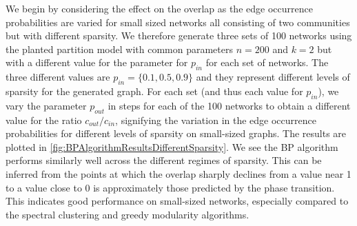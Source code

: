 We begin by considering the effect on the overlap as the edge occurrence probabilities are varied for small sized networks all consisting of two communities but with different sparsity.
We therefore generate three sets of 100 networks using the planted partition model with common parameters $n = 200$ and $k = 2$ but with a different value for the parameter for $p_{in}$ for each set of networks.
The three different values are $p_{in} = \{0.1, 0.5, 0.9\}$ and they represent different levels of sparsity for the generated graph.
For each set (and thus each value for $p_{in}$), we vary the parameter $p_{out}$ in steps for each of the 100 networks to obtain a different value for the ratio $c_{out}/c_{in}$, signifying the variation in the edge occurrence probabilities for different levels of sparsity on small-sized graphs.
The results are plotted in \cref{fig:BPAlgorithmResultsDifferentSparsity}.
We see the BP algorithm performs similarly well across the different regimes of sparsity.
This can be inferred from the points at which the overlap sharply declines from a value near 1 to a value close to 0 is approximately those predicted by the phase transition.
This indicates good performance on small-sized networks, especially compared to the spectral clustering and greedy modularity algorithms.

